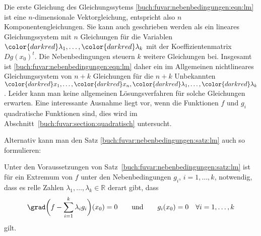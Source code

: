 Die erste Gleichung des Gleichungssytems
\eqref{buch:fuvar:nebenbedingungen:eqn:lm}
ist eine $n$-dimensionale Vektorgleichung, entspricht also $n$
Komponentengleichungen.
Sie kann auch geschrieben werden als ein lineares Gleichungssystem
mit $n$ Gleichungen für die Variablen
${\color{darkred}\lambda_1},\dots,{\color{darkred}\lambda_k}$
mit der Koeffizientenmatrix $Dg(x_0)^t$.
Die Nebenbedingungen steuern $k$ weitere Gleichungen bei.
Insgesamt ist \eqref{buch:fuvar:nebenbedingungen:eqn:lm}
daher ein im Allgemeinen nichtlineares Gleichungssystem von $n+k$
Gleichungen für die $n+k$ Unbekannten
\(
{\color{darkred}x_1},\dots,{\color{darkred}x_n},
{\color{darkred}\lambda_1},\dots,{\color{darkred}\lambda_k}
\).
Leider kann man keine allgemeinen Lösungsverfahren für solche
Gleichungen erwarten.
Eine interessante Ausnahme liegt vor, wenn die Funktionen $f$ und $g_i$
quadratische Funktionen sind, dies wird im
Abschnitt~\ref{buch:fuvar:section:quadratisch}
untersucht.

Alternativ kann man den Satz
\ref{buch:fuvar:nebenbedingungen:satz:lm}
auch so formulieren:

\begin{satz}
\label{buch:fuvar:nebenbedingungen:satz:lm2}
Unter den Voraussetzungen von Satz~\eqref{buch:fuvar:nebenbedingungen:satz:lm}
ist für ein Extremum von $f$ unter den Nebenbedingungen $g_i$, $i=1,\dots,k$,
notwendig, dass
es relle Zahlen $\lambda_1,\dots,\lambda_k\in\mathbb{R}$ derart gibt,
dass 
\[
\grad\biggl(f-\sum_{i=1}^k \lambda_ig_i\biggr)(x_0) = 0
\qquad\text{und}\qquad
g_i(x_0)=0\quad \forall i=1,\dots,k
\]
gilt.
\end{satz}

